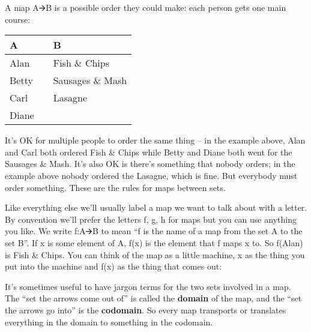 \documentclass[oneside,english]{amsbook}
\numberwithin{section}{chapter}
\theoremstyle{plain}
\theoremstyle{definition}
\begin{document}
A map A🡪B is a possible order they could make: each person gets one main
course:

\begin{longtable}[]{@{}
		>{\centering\arraybackslash}p{}
		>{\centering\arraybackslash}p{}
		>{\centering\arraybackslash}p{}@{}}
	\toprule\noalign{}
	\begin{minipage}[b]{\linewidth}\centering
		\textbf{A}
	\end{minipage} & \begin{minipage}[b]{\linewidth}\centering
	\end{minipage} & \begin{minipage}[b]{\linewidth}\centering
		\textbf{B}
	\end{minipage} \\
	\midrule\noalign{}
	\endhead
	\bottomrule\noalign{}
	\endlastfoot
	Alan & & Fish \& Chips \\
	Betty & & Sausages \& Mash \\
	Carl & & Lasagne \\
	Diane & & \\
\end{longtable}

It's OK for multiple people to order the same thing -- in the example
above, Alan and Carl both ordered Fish \& Chips while Betty and Diane
both went for the Sausages \& Mash. It's also OK is there's something
that nobody orders; in the example above nobody ordered the Lasagne,
which is fine. But everybody must order something. These are the rules
for maps between sets.

Like everything else we'll usually label a map we want to talk about
with a letter. By convention we'll prefer the letters f, g, h for maps
but you can use anything you like. We write f:A🡪B to mean ``f is the
name of a map from the set A to the set B''. If x is some element of A,
f(x) is the element that f maps x to. So f(Alan) is Fish \& Chips. You
can think of the map as a little machine, x as the thing you put into
the machine and f(x) as the thing that comes out:

It's sometimes useful to have jargon terms for the two sets involved in
a map. The ``set the arrows come out of'' is called the \textbf{domain}
of the map, and the ``set the arrows go into'' is the \textbf{codomain}.
So every map transports or translates everything in the domain to
something in the codomain.
\end{document}
